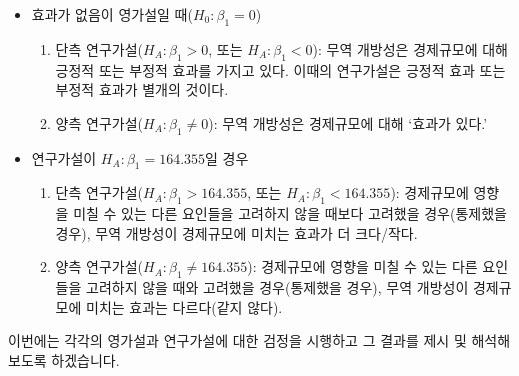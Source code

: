 \documentclass[
]{book}
\newenvironment{Shaded}{\begin{snugshade}}{\end{snugshade}}
\newcommand{\CommentTok}[1]{\textcolor[rgb]{0.56,0.35,0.01}{\textit{#1}}}
\newcommand{\DataTypeTok}[1]{\textcolor[rgb]{0.13,0.29,0.53}{#1}}
\newcommand{\DecValTok}[1]{\textcolor[rgb]{0.00,0.00,0.81}{#1}}
\newcommand{\KeywordTok}[1]{\textcolor[rgb]{0.13,0.29,0.53}{\textbf{#1}}}
\newcommand{\NormalTok}[1]{#1}
\newcommand{\OperatorTok}[1]{\textcolor[rgb]{0.81,0.36,0.00}{\textbf{#1}}}
\newcommand{\OtherTok}[1]{\textcolor[rgb]{0.56,0.35,0.01}{#1}}
\newcommand{\StringTok}[1]{\textcolor[rgb]{0.31,0.60,0.02}{#1}}
\begin{document}
\begin{itemize}
\item
  효과가 없음이 영가설일 때(\(H_0: \beta_1 = 0\))

  \begin{enumerate}
  \def\labelenumi{\arabic{enumi}.}
  \item
    단측 연구가설(\(H_A: \beta_1 > 0\), 또는 \(H_A: \beta_1 < 0\)): 무역 개방성은 경제규모에 대해 긍정적 또는 부정적 효과를 가지고 있다. 이때의 연구가설은 긍정적 효과 또는 부정적 효과가 별개의 것이다.
  \item
    양측 연구가설(\(H_A: \beta_1 \neq 0\)): 무역 개방성은 경제규모에 대해 `효과가 있다.'
  \end{enumerate}
\item
  연구가설이 \(H_A: \beta_1 = 164.355\)일 경우

  \begin{enumerate}
  \def\labelenumi{\arabic{enumi}.}
  \item
    단측 연구가설(\(H_A: \beta_1 > 164.355\), 또는 \(H_A: \beta_1 < 164.355\)): 경제규모에 영향을 미칠 수 있는 다른 요인들을 고려하지 않을 때보다 고려했을 경우(통제했을 경우), 무역 개방성이 경제규모에 미치는 효과가 더 크다/작다.
  \item
    양측 연구가설(\(H_A: \beta_1 \neq 164.355\)): 경제규모에 영향을 미칠 수 있는 다른 요인들을 고려하지 않을 때와 고려했을 경우(통제했을 경우), 무역 개방성이 경제규모에 미치는 효과는 다르다(같지 않다).
  \end{enumerate}
\end{itemize}

이번에는 각각의 영가설과 연구가설에 대한 검정을 시행하고 그 결과를 제시 및 해석해보도록 하겠습니다.

\begin{Shaded}
\end{Shaded}
\end{document}
